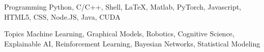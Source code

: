 


\begin{cvskills}


\cvskill
{Programming} %
{Python, C/C++, Shell, LaTeX, Matlab, PyTorch, Javascript, HTML5, CSS, Node.JS, Java, CUDA} %


\cvskill
{Topics} %
{Machine Learning, Graphical Models, Robotics, Cognitive Science, Explainable AI, Reinforcement Learning, Bayesian Networks, Statistical Modeling} %



\end{cvskills}